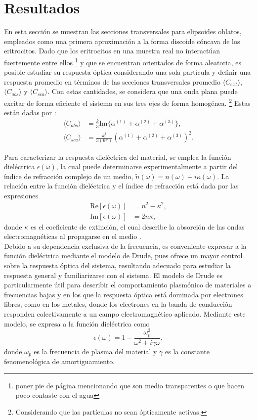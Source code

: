 \section{Resultados}
En esta sección se muestran las secciones transversales para elipsoides oblatos, empleados como una primera aproximación a la forma discoide cóncava de los eritrocitos. Dado que los eritrocitos en una muestra real no interactúan fuertemente entre ellos \footnote{poner pie de página mencionando que son medio transparentes o que hacen poco contaste con el agua} y que se encuentran orientados de forma aleatoria, es posible estudiar su respuesta óptica considerando una sola partícula y definir una respuesta promedio en términos de las secciones transversales promedio $\langle C_{ext} \rangle$, $\langle C_{abs} \rangle$ y $\langle C_{sca} \rangle$. Con estas cantidades, se considera que una onda plana puede excitar de forma eficiente el sistema en sus tres ejes de forma homogénea. \footnote{Considerando que las partículas no sean ópticamente activas.} Estas están dadas por \cite{Bohren}:
\begin{align*}
	\langle C_{abs}\rangle &= \frac{k}{3} \text{Im}\{\alpha^{(1)}+\alpha^{(2)}+\alpha^{(3)}\},\\
	\langle C_{sca}\rangle &= \frac{k^4}{3(6\pi)} \left(\alpha^{(1)}+\alpha^{(2)}+\alpha^{(3)}\right)^2.
\end{align*}

Para caracterizar la respuesta dieléctrica del material, se emplea la función dieléctrica $\epsilon(\omega)$, la cual puede determinarse experimentalmente a partir del índice de refracción complejo de un medio, $\tilde{n}(\omega) = n(\omega) + i\kappa(\omega)$. La relación entre la función dieléctrica y el índice de refracción está dada por las expresiones \cite{Plasmonics}
\begin{align} 
	\text{Re}[\epsilon(\omega)] &= n^2 - \kappa^2,\\
	\text{Im}[\epsilon(\omega)] &= 2n\kappa, \end{align}
donde $\kappa$ es el coeficiente de extinción, el cual describe la absorción de las ondas electromagnéticas al propagarse en el medio \cite{Plasmonics}.\\

Debido a su dependencia exclusiva de la frecuencia, es conveniente expresar a la función dieléctrica mediante el modelo de Drude, pues ofrece un mayor control sobre la respuesta óptica del sistema, resultando adecuado para estudiar la respuesta general y familiarizarse con el sistema. El modelo de Drude es particularmente útil para describir el comportamiento plasmónico de materiales a frecuencias bajas y en los que la respuesta óptica está dominada por electrones libres, como en los metales, donde los electrones en la banda de conducción responden colectivamente a un campo electromagnético aplicado. Mediante este modelo, se expresa a la función dieléctrica como \cite{Plasmonics}
\begin{equation} \epsilon(\omega) = 1 - \frac{\omega_p^2}{\omega^2 + i\gamma\omega}, \end{equation}
donde $\omega_p$ es la frecuencia de plasma del material y $\gamma$ es la constante fenomenológica de amortiguamiento. \\

